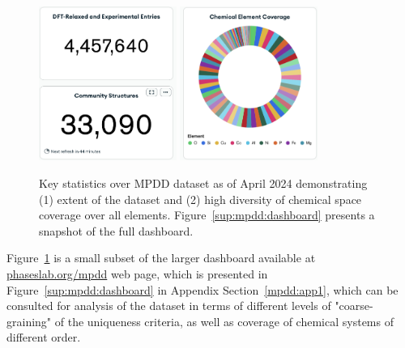 \begin{figure}[H]
    \centering
    \includegraphics[width=0.4\textwidth]{mpdd/Screenshot1.png}
    \includegraphics[width=0.4\textwidth]{mpdd/Screenshot2.png}
    \caption{Key statistics over MPDD dataset as of April 2024 demonstrating (1) extent of the dataset and (2) high diversity of chemical space coverage over all elements. Figure~\ref{sup:mpdd:dashboard} presents a snapshot of the full dashboard.}
    \label{mpdd:fig:dataset}
\end{figure}

Figure~\ref{mpdd:fig:dataset} is a small subset of the larger dashboard available at \href{https://phaseslab.org/mpdd}{phaseslab.org/mpdd} web page, which is presented in Figure~\ref{sup:mpdd:dashboard} in Appendix Section~\ref{mpdd:app1}, which can be consulted for analysis of the dataset in terms of different levels of "coarse-graining" of the uniqueness criteria, as well as coverage of chemical systems of different order.

